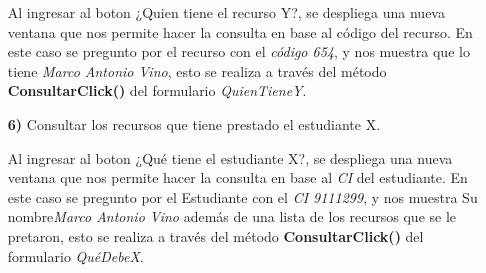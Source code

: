 \documentclass[12pt]{article}
\begin{document}
\begin{itemize}
\begin{center}
\end{center}
Al ingresar al boton ¿Quien tiene el recurso Y?, se despliega una nueva ventana que nos permite hacer la consulta en base al código del recurso.  En este caso se pregunto por el recurso con el \textit{código 654}, y nos muestra que lo tiene \textit{Marco Antonio Vino}, esto se realiza a través del método \textbf{ConsultarClick()} del formulario \textit{QuienTieneY}.  






\item[\textbf{6)}] Consultar los recursos que tiene prestado el estudiante X.

\begin{center}
\end{center}
Al ingresar al boton ¿Qué tiene el estudiante X?, se despliega una nueva ventana que nos permite hacer la consulta en base al \textit{CI} del estudiante.  En este caso se pregunto por el Estudiante con el \textit{CI 9111299}, y nos muestra Su nombre\textit{Marco Antonio Vino} además de una lista de los recursos que se le pretaron, esto se realiza a través del método \textbf{ConsultarClick()} del formulario \textit{QuéDebeX}.  


\end{itemize}
\end{document}
